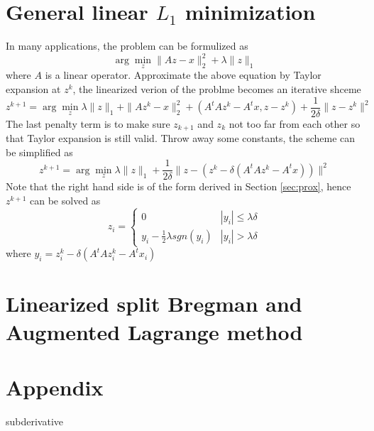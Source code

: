 \documentclass[11pt]{amsart}
\begin{document}
\section{General linear $L_1$ minimization}
In many applications, the problem can be formulized as
\begin{equation}
\arg\min_{z}\|Az-x\|^2_2 + \lambda \|z\|_1
\end{equation}
where $A$ is a linear operator. Approximate the above equation by Taylor expansion at $z^k$, the linearized verion of the problme becomes an iterative shceme
\begin{equation}
z^{k+1}=\arg\min_{z} \lambda \|z\|_1 + \|Az^k-x\|^2_2 + (A^tAz^k-A^tx, z-z^k) + \frac{1}{2\delta}\|z-z^k\|^2
\end{equation}
The last penalty term is to make sure $z_{k+1}$ and $z_{k}$ not too far from each other so that Taylor expansion is still valid.
Throw away some constants, the scheme can be simplified as 
\begin{equation}
z^{k+1}=\arg\min_{z} \lambda \|z\|_1 + \frac{1}{2\delta}\|z-(z^k-\delta(A^tAz^k-A^tx))\|^2
\end{equation}
Note that the right hand side is of the form derived in Section \ref{sec:prox}, hence $z^{k+1}$ can be solved as
\begin{equation}
z_i=\left\{
\begin{array}{lr}
0   & |y_i| \leq \lambda\delta\\
y_i - \frac{1}{2}\lambda sgn(y_i) & |y_i| > \lambda\delta
\end{array}
\right.
\end{equation}
where $y_i = z^k_i-\delta(A^tAz^k_i-A^tx_i)$
\section{Linearized split Bregman and Augmented Lagrange method}
\section{Appendix}
subderivative
\end{document}
